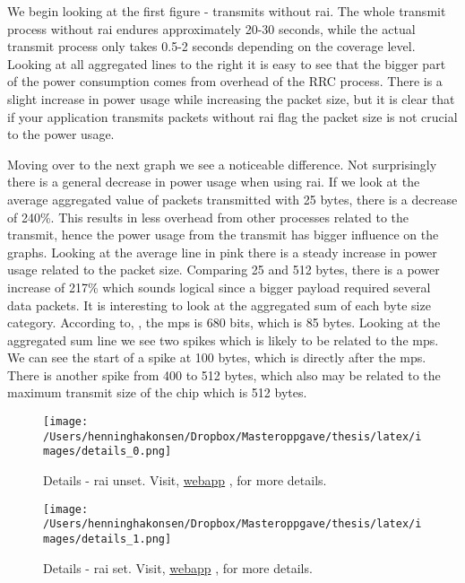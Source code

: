 \documentclass[USenglish]{ifimaster}  %
\begin{document}
We begin looking at the first figure - transmits without \acrshort{rai}. The whole transmit process without \acrshort{rai} endures approximately 20-30 seconds, while the actual transmit process only takes 0.5-2 seconds depending on the coverage level. Looking at all aggregated lines to the right it is easy to see that the bigger part of the power consumption comes from overhead of the RRC process. There is a slight increase in power usage while increasing the packet size, but it is clear that if your application transmits packets without \acrshort{rai} flag the packet size is not crucial to the power usage.

Moving over to the next graph we see a noticeable difference. Not surprisingly there is a general decrease in power usage when using \acrshort{rai}. If we look at the average aggregated value of packets transmitted with 25 bytes, there is a decrease of 240\%. This results in less overhead from other processes related to the transmit, hence the power usage from the transmit has bigger influence on the graphs. Looking at the average line in pink there is a steady increase in power usage related to the packet size. Comparing 25 and 512 bytes, there is a power increase of 217\% which sounds logical since a bigger payload required several data packets. It is interesting to look at the aggregated sum of each byte size category. According to, \cite{online:rohde}, the \acrfull{mps} is 680 bits, which is 85 bytes. Looking at the aggregated sum line we see two spikes which is likely to be related to the \acrshort{mps}. We can see the start of a spike at 100 bytes, which is directly after the \acrshort{mps}. There is another spike from 400 to 512 bytes, which also may be related to the maximum transmit size of the chip which is 512 bytes.

\begin{figure}[H]
  \centering
  \texttt{[image: /Users/henninghakonsen/Dropbox/Masteroppgave/thesis/latex/images/details\_0.png]}
  \caption{Details - \acrshort{rai} unset. Visit, \href{http://158.39.77.97:9000/\#/results/UiO\_TELIA\_long\_term\_2018-03-22\_0x0\_30\_20}{webapp} \cite{online:result7}, for more details.}
  \label{figure:details_0}
\end{figure}

\begin{figure}[H]
  \centering
  \texttt{[image: /Users/henninghakonsen/Dropbox/Masteroppgave/thesis/latex/images/details\_1.png]}
  \caption{Details - \acrshort{rai} set.  Visit, \href{http://158.39.77.97:9000/\#/results/UiO\_TELIA\_long\_term\_2018-03-22\_0x2\_30\_20}{webapp} \cite{online:result8}, for more details.}
  \label{figure:details_1}
\end{figure}
\end{document}
